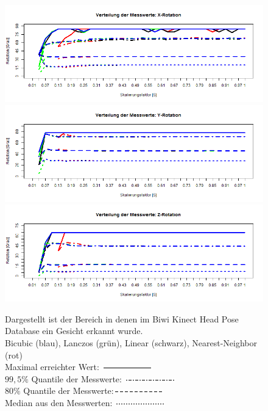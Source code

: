 \begin{figure}
	\centering
	\includegraphics[width=\linewidth]{img_Skalierung/Skal_Max_RX}
	\includegraphics[width=\linewidth]{img_Skalierung/Skal_Max_RY}
	\includegraphics[width=\linewidth]{img_Skalierung/Skal_Max_RZ}
	\caption{Dargestellt ist der Bereich in denen im Biwi Kinect Head Pose Database \cite{BIWI_database} ein Gesicht erkannt wurde.\\
		Bicubic (blau), Lanczos (grün), Linear (schwarz), Nearest-Neighbor (rot)\\
		Maximal erreichter Wert: \protect\includegraphics[width=0.15\linewidth]{line/Line1}\\
		$99,5\%$ Quantile der Messwerte: \protect\includegraphics[width=0.15\linewidth]{line/Line4}\\
		$80\%$ Quantile der Messwerte:\protect\includegraphics[width=0.15\linewidth]{line/Line2}\\
		Median aus den Messwerten: \protect\includegraphics[width=0.15\linewidth]{line/Line3}}
	\label{img_Rot_Max}
\end{figure}
